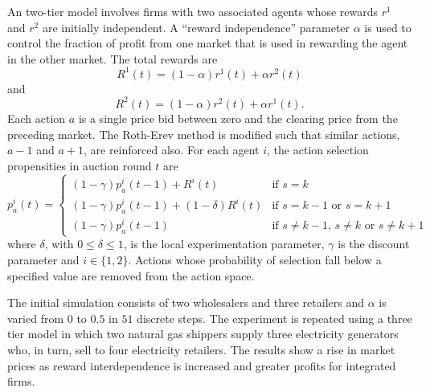 An two-tier model involves firms with two associated agents
whose rewards $r^1$ and $r^2$ are initially independent.  A ``reward
independence'' parameter $\alpha$ is used to control the fraction of profit
from one market that is used in rewarding the agent in the other market.
The total rewards are
\begin{equation}
R^1(t) = (1-\alpha)r^1(t) + \alpha r^2(t)
\end{equation}
and
\begin{equation}
R^2(t) = (1-\alpha)r^2(t) + \alpha r^1(t).
\end{equation}
Each action $a$ is a single price bid between zero and the clearing price from
the preceding market.  The Roth-Erev method is modified such that similar
actions, $a-1$ and $a+1$, are reinforced also.  For each agent $i$, the action
selection propensities in auction round $t$ are
\begin{equation}
p^i_a(t) = \begin{cases}
(1-\gamma)p^i_a(t-1) + R^i(t)& \text{if $s=k$}\\
(1-\gamma)p^i_a(t-1) + (1-\delta)R^i(t)& \text{if $s=k-1$ or $s=k+1$}\\
(1-\gamma)p^i_a(t-1)& \text{if $s\neq k-1$, $s\neq k$ or $s\neq k+1$}
\end{cases}
\end{equation}
where $\delta$, with $0\leq \delta \leq 1$, is the local experimentation
parameter, $\gamma$ is the discount parameter and $i\in \lbrace 1,2 \rbrace$.
Actions whose probability of selection fall below a specified value are
removed from the action space.

The initial simulation consists of two wholesalers and three retailers and
$\alpha$ is varied from $0$ to $0.5$ in $51$ discrete steps.  The experiment
is repeated using a three tier model in which two natural gas shippers supply
three electricity generators who, in turn, sell to four electricity retailers.
The results show a rise in market prices as reward interdependence is
increased and greater profits for integrated firms.

